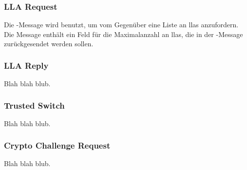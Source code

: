\isprotoversionbytefield

%
%	
%	
%	
%

\subsubsection{LLA Request}
\label{dcl-isproto-llareq}
Die \isprotollareq-Message wird benutzt, um vom Gegenüber eine Liste an \glspl{lla} anzufordern.
Die Message enthält ein Feld für die Maximalanzahl an \glspl{lla}, die in der
\isprotollarep-Message zurückgesendet werden sollen.

\isprotollareqbytefield

\subsubsection{LLA Reply}
\label{dcl-isproto-llarep}
Blah blah blub.

\isprotollarepbytefield

\subsubsection{Trusted Switch}
\label{dcl-isproto-ts}
Blah blah blub.

\isprototsbytefield

\subsubsection{Crypto Challenge Request}
\label{dcl-isproto-ccreq}
Blah blah blub.

\isprotoccreqbytefield


